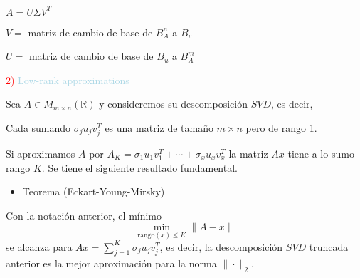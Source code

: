 \documentclass[12pt]{article}
\begin{document}
$A=U\Sigma V^T$

$V=$ matriz de cambio de base de $B_A^n$ a $B_v$

$U=$ matriz de cambio de base de $B_u$ a $B_A^m$

\textcolor{red}{2) }\textcolor{lightblue}{Low-rank approximations}

Sea $A\in M_{m\times n}(\mathbb{R})$ y consideremos su descomposición $SVD$, es decir, 

\begin{center}
\end{center}
Cada sumando $\sigma_ju_jv_j^T$ es una matriz de tamaño $m\times n $ pero de rango 1.

Si aproximamos $A$ por $A_K=\sigma_1u_1v_1^T+\cdots+\sigma_xu_xv_x^T$ la matriz $Ax$ tiene a lo sumo rango $K$. Se tiene el siguiente resultado fundamental.
\begin{itemize}[label=\color{red}\textbullet, leftmargin=*]
    \item \color{lightblue}Teorema (Eckart-Young-Mirsky)
\end{itemize}
Con la notación anterior, el mínimo \[\min_{\mathrm{rango}(x)\le K}\|A-x\|\] se alcanza para $Ax=\sum_{j=1}^K\sigma_ju_jv_j^T$, es decir, la descomposición $SVD$ truncada anterior es la mejor aproximación para la norma $\|\cdot\|_2$.
\end{document}
